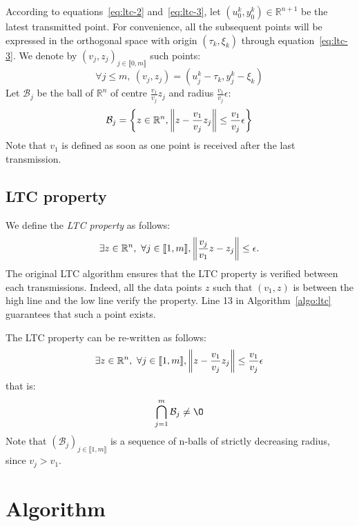 According to equations~\eqref{eq:ltc-2} and~\eqref{eq:ltc-3}, let $(u_0^k,
y_0^k) \in \mathbb{R}^{n+1}$ be the latest transmitted point. For convenience,
all the subsequent points will be expressed in the orthogonal space with origin
$(\tau_k, \xi_k)$ through equation~\eqref{eq:ltc-3}. We denote by $(v_j, z_j)_{j
\in \llbracket 0, m \rrbracket}$ such points:
\begin{equation}
\forall j \leq m,\  (v_j, z_j) = (u_j^k - \tau_k, y_j^k - \xi_k)
\end{equation}
Let $\mathcal{B}_j$ be the ball of $\mathbb{R}^n$ of centre $\frac{v_1}{v_j}z_j$
and radius $\frac{v_1}{v_j}\epsilon$:
\begin{equation}
\mathcal{B}_j = \left\{ z \in \mathbb{R}^n,\left\lVert z-\frac{v_1}{v_j}z_j\right\rVert \leq\frac{v_1}{v_j}\epsilon \right\}
\end{equation}
Note that $v_1$ is defined as soon as one point is received after the last
transmission.

\subsection{LTC property}

We define the \emph{LTC property} as follows:
\begin{equation}
\exists z \in \mathbb{R}^n, \ \forall j \in \llbracket 1, m \rrbracket, \left\lVert\frac{v_j}{v_1}z-z_j\right\rVert \leq
\epsilon.
\end{equation}
The original LTC algorithm ensures that the LTC property is
verified between each transmissions. Indeed, all the data points
$z$ such that $(v_1, z)$ is between the high line and the low line
verify the property. Line 13 in Algorithm~\ref{algo:ltc} guarantees that
such a point exists.

The LTC property can be re-written as follows:
\begin{equation}
\exists z \in \mathbb{R}^n, \ \forall j \in \llbracket 1, m \rrbracket, \left\lVert z-\frac{v_1}{v_j}z_j\right\rVert \leq
\frac{v_1}{v_j}\epsilon
\end{equation}
that is:
\begin{equation}
\bigcap_{j=1}^m \mathcal{B}_j \neq \O
\label{eq:ltc-property}
\end{equation}
Note that $(\mathcal{B}_j)_{j \in \llbracket 1, m \rrbracket}$ is a sequence
of n-balls of strictly decreasing radius, since $v_j > v_1$.

\section{Algorithm}

